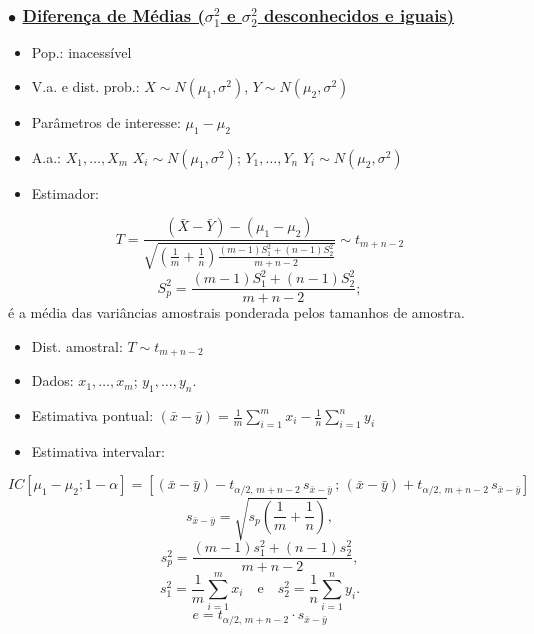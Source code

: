 \documentclass[11pt,a4paper]{article}
\begin{document}
\subsubsection*{$\bullet$ \underline{Diferença de Médias ($\sigma_1^2$ e $\sigma_2^2$ desconhecidos e iguais)}}
\begin{itemize}
  \item Pop.: inacessível
  \item V.a. e dist. prob.: $X \sim N(\mu_1,\sigma^2)$, \; $Y \sim N(\mu_2,\sigma^2)$
  \item Parâmetros de interesse: $\mu_1-\mu_2$
  \item A.a.: $X_1,\ldots,X_m$ $X_i \sim N(\mu_1,\sigma^2)$; \; $Y_1,\ldots,Y_n$ $Y_i \sim N(\mu_2,\sigma^2)$
  \item Estimador:
\end{itemize}
\[ T = \frac{(\bar{X}-\bar{Y})-(\mu_1-\mu_2)}{\sqrt{\left(\frac{1}{m}+\frac{1}{n}\right)\frac{(m-1)S_1^2+(n-1)S_2^2}{m+n-2}}} \sim t_{m+n-2} \]
\[ S_p^2 = \frac{(m-1)S_1^2+(n-1)S_2^2}{m+n-2}; \]
é a média das variâncias amostrais ponderada pelos tamanhos de amostra.
\begin{itemize}
  \item Dist. amostral: $T \sim t_{m+n-2}$
  \item Dados: $x_1,\ldots,x_m$; $y_1,\ldots,y_n$.
  \item Estimativa pontual: $\displaystyle (\bar{x}-\bar{y}) = \frac{1}{m}\sum_{i=1}^{m}x_i - \frac{1}{n}\sum_{i=1}^{n}y_i$
  \item Estimativa intervalar:
\end{itemize}
\[ IC[\mu_1-\mu_2;1-\alpha] = \left[(\bar{x}-\bar{y}) - t_{\alpha/2,\,m+n-2}\,s_{\bar{x}-\bar{y}}\,;\,(\bar{x}-\bar{y}) + t_{\alpha/2,\,m+n-2}\,s_{\bar{x}-\bar{y}}\right] \]
\[ s_{\bar{x}-\bar{y}} = \sqrt{s_p\left(\frac{1}{m}+\frac{1}{n}\right)}, \]
\[ s_p^2 = \frac{(m-1)s_1^2+(n-1)s_2^2}{m+n-2}, \]
\[ s_1^2 = \frac{1}{m}\sum_{i=1}^{m}x_i \quad\text{e}\quad s_2^2 = \frac{1}{n}\sum_{i=1}^{n}y_i. \]
\[ e = t_{\alpha/2,\,m+n-2}\cdot s_{\bar{x}-\bar{y}} \]
\end{document}

